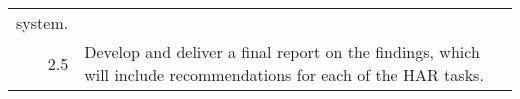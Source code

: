 \begin{tabular}{r L{5in}}
    system.                                                                                                                                                                                                                                                                                                                                                                            \\
    2.5  & Develop and deliver a final report on the findings, which will include recommendations for each of the HAR tasks.                                                                                                                                                                                                                                                           \\
    \bottomrule
\end{tabular}
